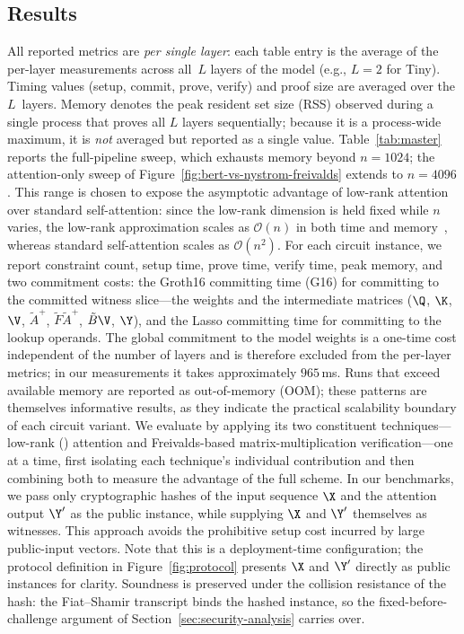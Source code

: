 \subsection{Results}
\label{subsec:pipeline-costs}
All reported metrics are \emph{per single layer}: each table entry is the average of the per-layer measurements across all~$L$ layers of the model (e.g., $L{=}2$ for Tiny). Timing values (setup, commit, prove, verify) and proof size are averaged over the $L$~layers. Memory denotes the peak resident set size (RSS) observed during a single process that proves all $L$ layers sequentially; because it is a process-wide maximum, it is \emph{not} averaged but reported as a single value.  Table~\ref{tab:master} reports the full-pipeline sweep, which exhausts memory beyond $n{=}1024$; the attention-only sweep of Figure~\ref{fig:bert-vs-nystrom-freivalds} extends to $n{=}4096$. This range is chosen to expose the asymptotic advantage of low-rank attention over standard self-attention: since the low-rank dimension is held fixed while $n$ varies, the low-rank approximation scales as $\mathcal{O}(n)$ in both time and memory~\cite{Nystromformer}, whereas standard self-attention scales as $\mathcal{O}(n^2)$. For each circuit instance, we report constraint count, setup time, prove time, verify time, peak memory, and two commitment costs: the Groth16 committing time (G16) for committing to the committed witness slice---the weights and the intermediate matrices ($\Q$, $\K$, $\V$, $\tilde{A}^{+}$, $\tilde{F}\tilde{A}^{+}$, $\tilde{B}\V$, $\Y$), and the Lasso committing time for committing to the lookup operands. The global commitment to the model weights is a one-time cost independent of the number of layers and is therefore excluded from the per-layer metrics; in our measurements it takes approximately $965$\,ms. Runs that exceed available memory are reported as out-of-memory (OOM); these patterns are themselves informative results, as they indicate the practical scalability boundary of each circuit variant. We evaluate \name by applying its two constituent techniques---low-rank (\nystrom) attention and Freivalds-based matrix-multiplication verification---one at a time, first isolating each technique's individual contribution and then combining both to measure the advantage of the full scheme.
In our benchmarks, we pass only cryptographic hashes of the input sequence $\X$ and the attention output $\Y'$ as the public instance, while supplying $\X$ and $\Y'$ themselves as witnesses. This approach avoids the prohibitive setup cost incurred by large public-input vectors. Note that this is a deployment-time configuration; the protocol definition in Figure~\ref{fig:protocol} presents $\X$ and $\Y'$ directly as public instances for clarity. Soundness is preserved under the collision resistance of the hash: the Fiat--Shamir transcript binds the hashed instance, so the fixed-before-challenge argument of Section~\ref{sec:security-analysis} carries over.

